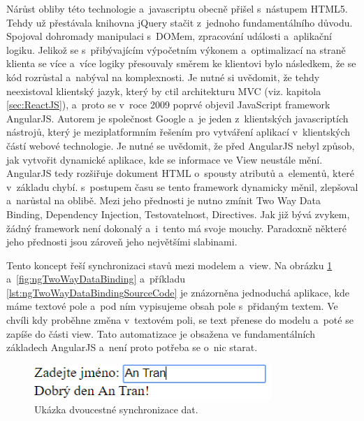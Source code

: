 Nárůst obliby této technologie a~javascriptu obecně přišel s~nástupem HTML5. Tehdy už přestávala knihovna jQuery stačit z~jednoho fundamentálního důvodu. Spojoval dohromady manipulaci s~DOMem, zpracování události a~aplikační logiku. Jelikož se s~přibývajícím výpočetním výkonem a~optimalizací na straně klienta se více a~více logiky přesouvaly směrem ke klientovi bylo následkem, že se kód rozrůstal a~nabýval na komplexnosti. Je nutné si uvědomit, že tehdy neexistoval klientský jazyk, který by ctil architekturu MVC (viz. kapitola \ref{sec:ReactJS}), a~proto se v~roce 2009 poprvé objevil JavaScript framework AngularJS. Autorem je společnost Google a~je jeden z~klientských javascriptích nástrojů, který je meziplatformním řešením pro vytváření aplikací v~klientských částí webové technologie. Je nutné se uvědomit, že před AngularJS nebyl způsob, jak vytvořit dynamické aplikace, kde se informace ve View neustále mění. AngularJS tedy rozšiřuje dokument HTML o~spousty atributů a~elementů, které v~základu chybí.  s~postupem času se tento framework dynamicky měnil, zlepšoval a~narůstal na oblibě. Mezi jeho přednosti je nutno zmínit Two Way Data Binding, Dependency Injection, Testovatelnost, Directives. Jak již bývá zvykem, žádný framework není dokonalý a~i~tento má svoje mouchy. Paradoxně některé jeho přednosti jsou zároveň jeho největšími slabinami. \\


Tento koncept řeší synchronizaci stavů mezi modelem a~view. Na obrázku \ref{fig:ngTwoWayDataBinding1} a~\ref{fig:ngTwoWayDataBinding} a~příkladu \ref{lst:ngTwoWayDataBindingSourceCode} je znázorněna jednoduchá aplikace, kde máme textové pole a~pod ním vypisujeme obsah pole s~přidaným textem. Ve chvíli kdy proběhne změna v~textovém poli, se text přenese do modelu a~poté se zapíše do části view. Tato automatizace je obsažena ve fundamentálních základech AngularJS a~není proto potřeba se o~nic starat. 

\begin{figure} [H]
	\centering
	\includegraphics[width=9cm]{../Angular1.png}
	\caption{Ukázka dvoucestné synchronizace dat.}
	\label{fig:ngTwoWayDataBinding1}
\end{figure}

\vspace{5mm}

